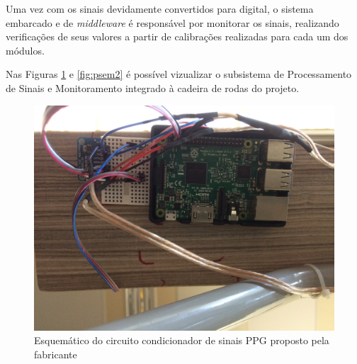 Uma vez com os sinais devidamente convertidos para digital, o sistema embarcado e de \textit{middleware}
é responsável por monitorar os sinais, realizando verificações de seus valores a partir de calibrações
realizadas para cada um dos módulos.

Nas Figuras \ref{fig:psem1} e \ref{fig:psem2} é possível vizualizar o subsistema 
de Processamento de Sinais e Monitoramento integrado à cadeira de rodas do 
projeto.

\begin{figure}[h!]
    \begin{center}
        \includegraphics[scale=0.07]{figuras/psem1.jpg}
    \end{center}
    \caption{Esquemático do circuito condicionador de sinais PPG proposto pela fabricante}
    \label{fig:psem1}
\end{figure}

